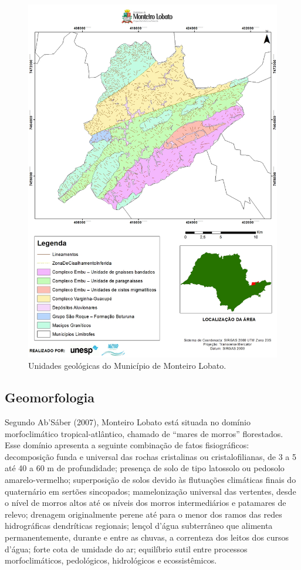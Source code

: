 \begin{figure}[h!]
	\centering
	\includegraphics[width=0.85\linewidth]{produtos/proddois/image018}
	\caption{Unidades geológicas do Município de Monteiro Lobato.}
	\label{fig:image018}
\end{figure}
\clearpage

\subsection{Geomorfologia}

Segundo Ab’Sáber (2007), Monteiro Lobato está situada no domínio morfoclimático tropical-atlântico, chamado de “mares de morros” florestados. Esse domínio apresenta a seguinte combinação de fatos fisiográficos: decomposição funda e universal das rochas cristalinas ou cristalofilianas, de 3 a 5 até 40 a 60 m de profundidade; presença de solo de tipo latossolo ou pedosolo amarelo-vermelho; superposição de solos devido às flutuações climáticas finais do quaternário em sertões sincopados; mamelonização universal das vertentes, desde o nível de morros altos até os níveis dos morros intermediários e patamares de relevo; drenagem originalmente perene até para o menor dos ramos das redes hidrográficas dendríticas regionais; lençol d’água subterrâneo que alimenta permanentemente, durante e entre as chuvas, a correnteza dos leitos dos cursos d’água; forte cota de umidade do ar; equilíbrio sutil entre processos morfoclimáticos, pedológicos, hidrológicos e ecossistêmicos.

